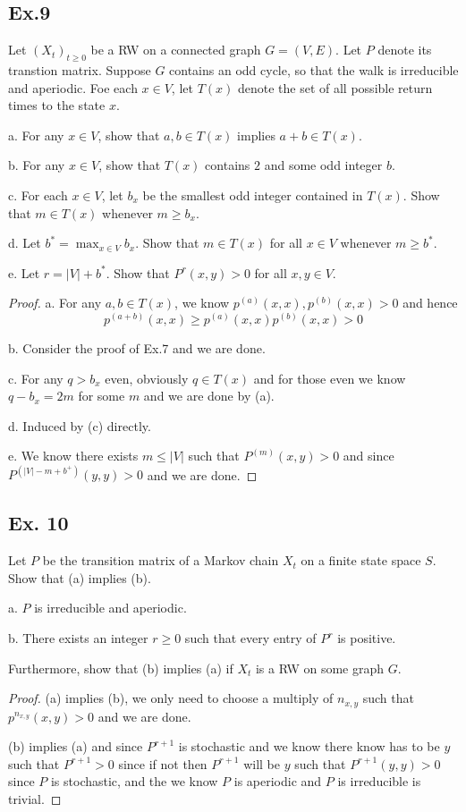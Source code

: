 \documentclass[lang=en,11pt,a4paper,citestyle =authoryear]{elegantpaper}
\begin{document}
\subsection*{Ex.9} 
Let $(X_t)_{t\geq 0}$ be a RW on a connected graph $G = (V,E)$. Let $P$ denote its transtion matrix. Suppose $G$ contains an odd cycle, so that the walk is irreducible and aperiodic. Foe each $x\in V$, let $T(x)$ denote the set of all possible return times to the state $x$.\par
a. For any $x\in V$, show that $a,b\in T(x)$ implies $a+b\in T(x)$.\par
b. For any $x\in V$, show that $T(x)$ contains $2$ and some odd integer $b$.\par
c. For each $x\in V$, let $b_x$ be the smallest odd integer contained in $T(x)
$. Show that $m \in T(x)$ whenever $m\geq b_x$.\par
d. Let $b^* = \max_{x\in V}b_x$. Show that $m\in T(x)$ for all $x\in V$ whenever $m\geq b^*$.\par
e. Let $r = |V| + b^*$. Show that $P^r(x,y) > 0$ for all $x,y\in V$.
\begin{proof}
    a. For any $a,b\in T(x)$, we know $p^{(a)}(x,x), p^{(b)}(x,x) > 0$ and hence
    \[
    p^{(a+b)}(x,x) \geq p^{(a)}(x,x)p^{(b)}(x,x) > 0
    \]\par
    b. Consider the proof of Ex.7 and we are done.\par
    c. For any $q > b_x$ even, obviously $q \in T(x)$ and for those even we know $q - b_x = 2m$ for some $m$ and we are done by (a).\par
    d. Induced by (c) directly.\par
    e. We know there exists $m \leq |V|$ such that $P^{(m)}(x,y) > 0$ and since $P^{(|V|-m+b^+)}(y,y) > 0$ and we are done. 
\end{proof}

\subsection*{Ex. 10}
Let $P$ be the transition matrix of a Markov chain $X_t$ on a finite state space $S$. Show that (a) implies (b).\par
a. $P$ is irreducible and aperiodic.\par
b. There exists an integer $r\geq 0$ such that every entry of $P^r$ is positive.\par
Furthermore, show that (b) implies (a) if $X_t$ is a RW on some graph $G$.
\begin{proof}
    (a) implies (b), we only need to choose a multiply of $n_{x,y}$ such that $p^{n_{x,y}}(x,y) > 0$ and we are done.\par
    (b) implies (a) and since $P^{r+1}$ is stochastic and we know there know has to be $y$ such that $P^{r+1} > 0$ since if not then $P^{r +1}$ will be $y$ such that $P^{r+1}(y,y)> 0$ since $P$ is stochastic, and the we know $P$ is aperiodic and $P$ is irreducible is trivial.
\end{proof}

\addappheadtotoc
\end{document}
